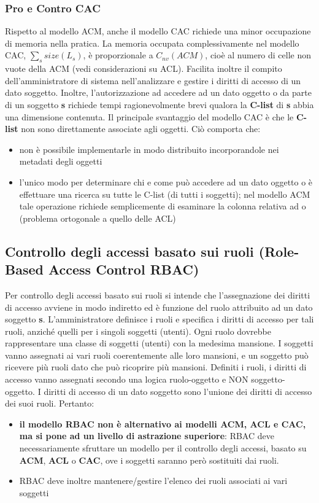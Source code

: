 \subsubsection{Pro e Contro CAC}
Rispetto al modello ACM, anche il modello CAC richiede una minor occupazione di memoria nella pratica. La memoria occupata complessivamente nel modello CAC,  $\sum_{s} size(L_{s})$, è proporzionale a $C_{nv} (ACM)$, cioè al numero di celle non vuote della ACM (vedi considerazioni su ACL). Facilita inoltre il compito dell'amministratore di sistema nell'analizzare e gestire i diritti di accesso di un dato soggetto. Inoltre, l'autorizzazione ad accedere ad un dato oggetto o da parte di un soggetto \textbf{s} richiede tempi ragionevolmente brevi qualora la \textbf{C-list} di \textbf{s} abbia una dimensione contenuta.\newline \newline
Il principale svantaggio del modello CAC è che le \textbf{C-list} non sono direttamente associate agli oggetti. Ciò comporta che:
\begin{itemize} 
  \item non è possibile implementarle in modo distribuito incorporandole nei metadati degli oggetti
  \item l'unico modo per determinare chi e come può accedere ad un dato oggetto o è effettuare una ricerca su tutte le C-list (di tutti i soggetti); nel modello ACM tale operazione richiede semplicemente di esaminare la colonna relativa ad o (problema ortogonale a quello delle ACL)
\end{itemize}

\subsection{Controllo degli accessi basato sui ruoli (Role-Based Access Control RBAC)}
Per controllo degli accessi basato sui ruoli si intende che l'assegnazione dei diritti di accesso avviene in modo indiretto ed è funzione del ruolo attribuito ad un dato soggetto \textbf{s}. L'amministratore definisce i ruoli e specifica i diritti di accesso per tali ruoli, anziché quelli per i singoli soggetti (utenti). Ogni ruolo dovrebbe rappresentare una classe di soggetti (utenti) con la medesima mansione. I soggetti vanno assegnati ai vari ruoli coerentemente alle loro mansioni, e un soggetto può ricevere più ruoli dato che può ricoprire più mansioni. Definiti i ruoli, i diritti di accesso vanno assegnati secondo una logica ruolo-oggetto e NON soggetto-oggetto. I diritti di accesso di un dato soggetto sono l'unione dei diritti di accesso dei suoi ruoli. Pertanto:
\begin{itemize} 
  \item \textbf{il modello RBAC non è alternativo ai modelli ACM, ACL e CAC, ma si pone ad un livello di astrazione superiore}: RBAC deve necessariamente sfruttare un modello per il controllo degli accessi, basato su \textbf{ACM}, \textbf{ACL} o \textbf{CAC}, ove i soggetti saranno però sostituiti dai ruoli.
  \item RBAC deve inoltre mantenere/gestire l'elenco dei ruoli associati ai vari soggetti
\end{itemize}


